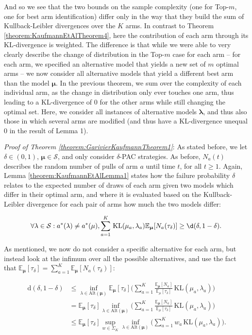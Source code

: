 \documentclass[12pt,]{article}
\newcommand{\KL}{\,\text{KL}}
\newcommand{\der}{\,\text{d}}
\begin{document}
And so we see that the two bounds on the sample complexity (one for
Top-\(m\), one for best arm identification) differ only in the way that
they build the sum of Kullback-Leibler divergences over the \(K\) arms.
In contrast to Theorem \ref{theorem:KaufmannEtAlTheorem4}, here the
contribution of each arm through its KL-divergence is weighted. The
difference is that while we were able to very clearly describe the
change of distribution in the Top-\(m\) case for each arm -- for each
arm, we specified an alternative model that yields a new set of \(m\)
optimal arms -- we now consider all alternative models that yield a
different best arm than the model \(\bm{\mu}\). In the previous theorem,
we sum over the complexity of each individual arm, as the change in
distribution only ever touches one arm, thus leading to a KL-divergence
of 0 for the other arms while still changing the optimal set. Here, we
consider all instances of alternative models \(\bm{\lambda}\), and thus
also those in which several arms are modified (and thus have a
KL-divergence unequal 0 in the result of Lemma 1).

\emph{Proof of Theorem \ref{theorem:GarivierKaufmannTheorem1}}: As
stated before, we let \(\delta \in (0,1)\),
\(\bm{\mu} \in \mathcal{S}\), and only consider \(\delta\)-PAC
strategies. As before, \(N_a(t)\) describes the random number of pulls
of arm \(a\) until time \(t\), for all \(t\geq 1\). Again, Lemma
\ref{theorem:KaufmannEtAlLemma1} states how the failure probability
\(\delta\) relates to the expected number of draws of each arm given two
models which differ in their optimal arm, and where it is evaluated
based on the Kullback-Leibler divergence for each pair of arms how much
the two models differ:

\begin{equation*}
\forall \lambda \in \mathcal{S}: a^*(\lambda) \neq a^*(\mu), \sum_{a=1}^K \KL(\mu_a,\lambda_a)\mathbb{E}_{\bm{\mu}}[N_a(\tau_{\delta})] \geq \d(\delta, 1- \delta).
\end{equation*}

As mentioned, we now do not consider a specific alternative for each
arm, but instead look at the infimum over all the possible alternatives,
and use the fact that
\(\mathbb{E}_{\bm{\mu}}[\tau_{\delta}] = \sum_{a=1}^K \mathbb{E}_{\bm{\mu}}[N_a(\tau_{\delta})]\):

\begin{align*}
\der(\delta, 1-\delta) & \leq \inf_{\lambda \in \text{Alt}(\bm{\mu})} \mathbb{E}_{\bm{\mu}}[\tau_{\delta}] \Big(\sum_{a=1}^K \frac{\mathbb{E}_{\bm{\mu}}[N_a]}{\mathbb{E}_{\mu}[\tau_{\delta}]} \KL(\mu_a, \lambda_a)\Big) \\
& = \mathbb{E}_{\bm{\mu}}[\tau_{\delta}] \inf_{\lambda \in \text{Alt}(\bm{\mu})} \Big(\sum_{a=1}^K \frac{\mathbb{E}_{\bm{\mu}}[N_a]}{\mathbb{E}_{\mu}[\tau_{\delta}]} \KL(\mu_a, \lambda_a)\Big) \\
& \leq \mathbb{E}_{\bm{\mu}}[\tau_{\delta}] \sup_{w \in \Sigma_K} \inf_{\lambda \in \text{Alt}(\bm{\mu})} \Big(\sum_{a=1}^K w_a \KL(\mu_a, \lambda_a)\Big).
\end{align*}
\end{document}
